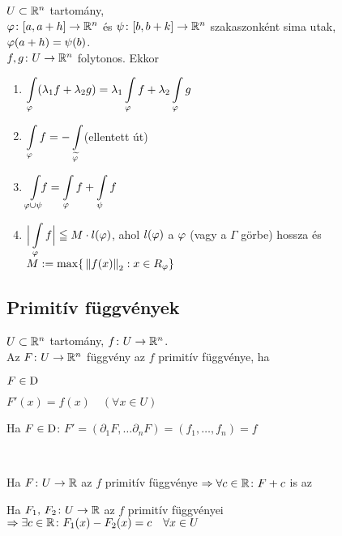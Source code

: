 \newpage
\begin{te}
  $U\subset \mathbb{R}^n$ tartomány,\\$\varphi\colon [a,a+h]\to\mathbb{R}^n$ és $\psi\colon [b,b+k]\to\mathbb{R}^n$ szakaszonként sima utak,
  $\varphi(a+h) = \psi(b)$.\\$f,g\colon U\to\mathbb{R}^n$ folytonos. Ekkor
  \begin{enumerate}
  \item $\di\Int_\vfi(\lambda_1 f +\lambda_2g) = \lambda_1\Int_\vfi f+ \lambda_2\Int_\vfi g$
  \item $\di\Int_\vfi f = -\Int_{\widetilde{\vfi}}$\qquad (ellentett út)
  \item $\di\Int_{\vfi\cup\psi}\!\!\! f = \Int_\vfi f + \Int_\psi f$
  \item $\di\Big\vert \Int_\vfi f\Big\vert \leqq M\cdot l(\vfi)$, ahol $l(\varphi)$ a $\varphi$ (vagy a $\Gamma$ görbe)
  hossza és $M:= \max \{\,\left\Vert f(x)\right\Vert_2:x\in R_\varphi\}$
  \end{enumerate}
\end{te}

\subsection{Primitív függvények}
\begin{de}$U\subset\mathbb{R}^n$ tartomány, $f\colon U\to\mathbb{R}^n$.\\
  Az $F\colon U\to\mathbb{R}^n$ függvény az $f$ primitív függvénye, ha
  \begin{enumzjr}
    \item $F\in\operatorname{D}$
    \item $F'(x) = f(x)\quad (\forall x\in U)$
  \end{enumzjr}
\end{de}

\begin{megj}
  Ha $F\in\operatorname{D}$: $F'=(\partial_1F,\dotsc\partial_nF) =(f_1,\dotsc,f_n)=f$
\end{megj}

\begin{te}\
  \begin{enumzjromai}
  \item Ha $F\colon U\to\mathbb{R}$ az $f$ primitív függvénye $\Rightarrow \forall c\in\mathbb{R}\colon F+c$ is az
  \item Ha $F_1,\,F_2\colon U\to\mathbb{R}$ az $f$ primitív függvényei $\Rightarrow \exists c\in\mathbb{R}\colon F_1(x)-F_2(x) = c \quad \forall
  x\in U$
  \end{enumzjromai}
\end{te}

